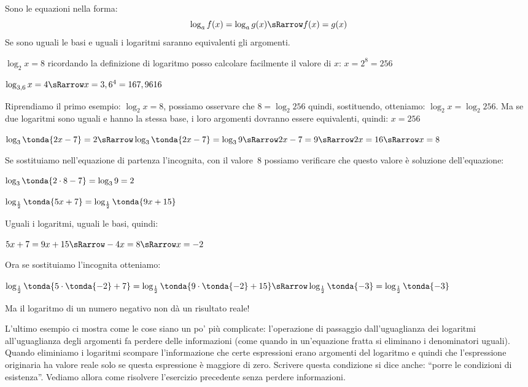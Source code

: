 Sono le equazioni nella forma:
\[\log_a{f(x)} = \log_a{g(x)} \sRarrow f(x) = g(x)\]
Se sono uguali le basi e uguali i logaritmi saranno equivalenti gli argomenti.

\begin{esempio}
 \(\log_2{x} = 8\) ricordando la definizione di logaritmo posso calcolare 
facilmente il valore di \(x\): \(x = 2^8 = 256\)
\end{esempio}

\begin{esempio}
 \(\log_{3,6}{x} = 4 \sRarrow x = 3,6^4 = 167,9616\)
\end{esempio}

\begin{esempio}
 Riprendiamo il primo esempio: \(\log_2{x} = 8\), possiamo osservare che 
 \(8 = \log_2{256}\) quindi, sostituendo, 
 otteniamo: \(\log_2{x} = \log_2{256}\). Ma se due logaritmi sono uguali e 
hanno la stessa base, i loro argomenti dovranno essere equivalenti, quindi:
\(x = 256\)
\end{esempio}

\begin{esempio}
 \(\log_{3}\tonda{2x-7} = 2 \sRarrow \log_{3}\tonda{2x-7} = \log_{3}9 \sRarrow 
 2x -7 = 9 \sRarrow 2x = 16 \sRarrow x = 8\)
 
 Se sostituiamo nell'equazione di partenza l'incognita, con il valore~8 
possiamo verificare che questo valore è soluzione dell'equazione:

\(\log_{3}\tonda{2 \cdot 8-7} = \log_{3} 9 = 2\)
\end{esempio}

\begin{esempio}
 \(\log_{\frac{1}{2}}\tonda{5x +7} = \log_{\frac{1}{2}}\tonda{9x +15}\)
 
 Uguali i logaritmi, uguali le basi, quindi:
 
 \(5x +7 = 9x +15 \sRarrow -4x = 8 \sRarrow x = -2\)
 
 Ora se sostituiamo l'incognita otteniamo:
 
 \(\log_{\frac{1}{2}}\tonda{5 \cdot \tonda{-2} +7} = 
   \log_{\frac{1}{2}}\tonda{9 \cdot \tonda{-2} +15} \sRarrow 
   \log_{\frac{1}{2}}\tonda{-3} = \log_{\frac{1}{2}}\tonda{-3}\)
   
 Ma il logaritmo di un numero negativo non dà un risultato reale!
\end{esempio}

L'ultimo esempio ci mostra come le cose siano un po' più complicate: 
l'operazione di passaggio dall'uguaglianza dei logaritmi all'uguaglianza degli 
argomenti fa perdere delle informazioni (come quando in un'equazione fratta si 
eliminano i denominatori uguali). 
Quando eliminiamo i logaritmi scompare l'informazione che certe espressioni 
erano argomenti del logaritmo e quindi che l'espressione originaria ha valore 
reale solo se questa espressione è maggiore di zero. 
Scrivere questa condizione si dice anche: ``porre le condizioni di esistenza''.
Vediamo allora come risolvere l'esercizio precedente senza perdere informazioni.

